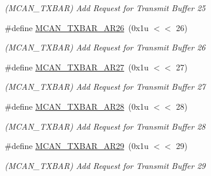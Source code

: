 \begin{DoxyCompactItemize}
\begin{DoxyCompactList}\small\item\em (M\+C\+A\+N\+\_\+\+T\+X\+B\+AR) Add Request for Transmit Buffer 25 \end{DoxyCompactList}\item 
\mbox{\label{group__SAMV71__MCAN_gaef332a491e7eb24f85bc95d6cb08e900}} 
\#define \mbox{\hyperlink{group__SAMV71__MCAN_gaef332a491e7eb24f85bc95d6cb08e900}{M\+C\+A\+N\+\_\+\+T\+X\+B\+A\+R\+\_\+\+A\+R26}}~(0x1u $<$$<$ 26)
\begin{DoxyCompactList}\small\item\em (M\+C\+A\+N\+\_\+\+T\+X\+B\+AR) Add Request for Transmit Buffer 26 \end{DoxyCompactList}\item 
\mbox{\label{group__SAMV71__MCAN_gad363dd123126e648083db354734b98f9}} 
\#define \mbox{\hyperlink{group__SAMV71__MCAN_gad363dd123126e648083db354734b98f9}{M\+C\+A\+N\+\_\+\+T\+X\+B\+A\+R\+\_\+\+A\+R27}}~(0x1u $<$$<$ 27)
\begin{DoxyCompactList}\small\item\em (M\+C\+A\+N\+\_\+\+T\+X\+B\+AR) Add Request for Transmit Buffer 27 \end{DoxyCompactList}\item 
\mbox{\label{group__SAMV71__MCAN_ga67be6634f8337bf4039eb7340c352a71}} 
\#define \mbox{\hyperlink{group__SAMV71__MCAN_ga67be6634f8337bf4039eb7340c352a71}{M\+C\+A\+N\+\_\+\+T\+X\+B\+A\+R\+\_\+\+A\+R28}}~(0x1u $<$$<$ 28)
\begin{DoxyCompactList}\small\item\em (M\+C\+A\+N\+\_\+\+T\+X\+B\+AR) Add Request for Transmit Buffer 28 \end{DoxyCompactList}\item 
\mbox{\label{group__SAMV71__MCAN_gae3ccee22139760fb0b5e4e1d6d8f4929}} 
\#define \mbox{\hyperlink{group__SAMV71__MCAN_gae3ccee22139760fb0b5e4e1d6d8f4929}{M\+C\+A\+N\+\_\+\+T\+X\+B\+A\+R\+\_\+\+A\+R29}}~(0x1u $<$$<$ 29)
\begin{DoxyCompactList}\small\item\em (M\+C\+A\+N\+\_\+\+T\+X\+B\+AR) Add Request for Transmit Buffer 29 \end{DoxyCompactList}\item 

\end{DoxyCompactItemize}
